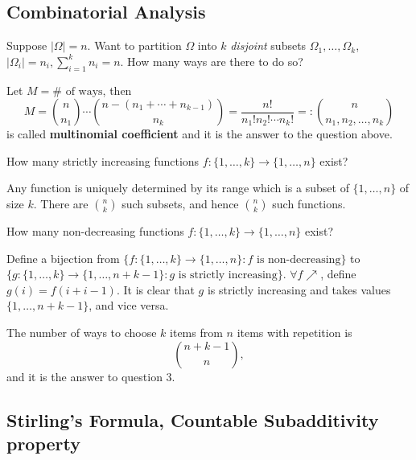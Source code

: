 \subsection{Combinatorial Analysis}

\begin{question}{1}
    Suppose $ |\Omega|=n $. Want to partition $ \Omega $ into $k$ \textit{disjoint} subsets $ \Omega_1,\dots,\Omega_k$, $ |\Omega_i|=n_i, \sum_{i=1}^{k}n_i=n $. How many ways are there to do so?
\end{question}

\begin{definition}
    Let $ M=\# \text{ of ways} $, then 
    \[
        M= \binom{n}{n_1}\cdots \binom{n-(n_1+\cdots+n_{k-1})}{n_k} = \frac{n!}{n_1!n_2!\cdots n_k!}
        =: \binom{n}{n_1,n_2,\dots,n_k}
    \]
    is called \textbf{multinomial coefficient} and it is the answer to the question above.
\end{definition}

\begin{question}{2}
    How many strictly increasing functions $ f: \{1,\dots,k\} \to \{1,\dots,n\}$ exist?
\end{question}

Any function is uniquely determined by its range which is a subset of $ \{1,\dots,n\} $ of size $k$. There are $ \binom{n}{k} $ such subsets, and hence $ \binom{n}{k} $ such functions.

\begin{question}{3}
    How many non-decreasing functions $ f: \{1,\dots,k\} \to \{1,\dots,n\}$ exist?
\end{question}

Define a bijection from $ \{f: \{1,\dots,k\}\to \{1,\dots,n\}: f \text{ is non-decreasing}\} $ to $ \{g: \{1,\dots,k\}\to \{1,\dots,n+k-1\}: g \text{ is strictly increasing}\} $. $ \forall f \nearrow $, define $ g(i)=f(i+i-1) $. It is clear that $g$ is strictly increasing and takes values $ \{1,\dots,n+k-1\} $, and vice versa.
\begin{proposition}\label{prop:Combination with Repetition}
    The number of ways to choose $k$ items from $n$ items with repetition is 
    \[
        \binom{n+k-1}{n},
    \]
    and it is the answer to question 3.
\end{proposition}
\subsection{Stirling's Formula, Countable Subadditivity property}